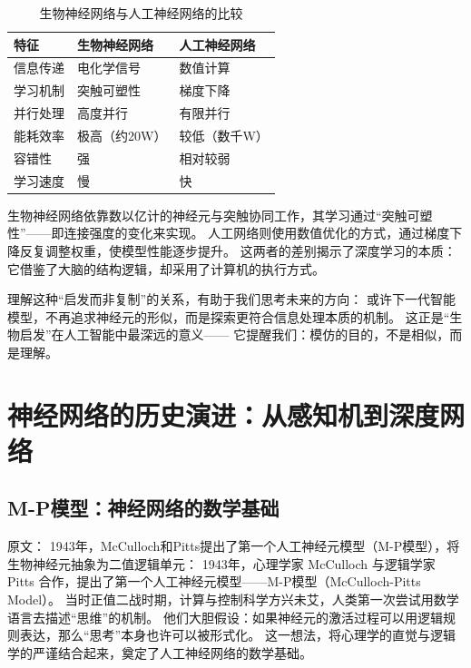 \begin{table}[htbp]
\centering
\caption{生物神经网络与人工神经网络的比较}
\label{tab:bio-vs-ann}
\begin{tabular}{|l|l|l|}
\hline
{\bf 特征} & {\bf 生物神经网络} & {\bf 人工神经网络} \\
\hline
信息传递 & 电化学信号 & 数值计算 \\
\hline
学习机制 & 突触可塑性 & 梯度下降 \\
\hline
并行处理 & 高度并行 & 有限并行 \\
\hline
能耗效率 & 极高（约20W） & 较低（数千W） \\
\hline
容错性 & 强 & 相对较弱 \\
\hline
学习速度 & 慢 & 快 \\
\hline
\end{tabular}
\end{table}

生物神经网络依靠数以亿计的神经元与突触协同工作，其学习通过“突触可塑性”——即连接强度的变化来实现。  
人工网络则使用数值优化的方式，通过梯度下降反复调整权重，使模型性能逐步提升。  
这两者的差别揭示了深度学习的本质：  
它借鉴了大脑的结构逻辑，却采用了计算机的执行方式。  

理解这种“启发而非复制”的关系，有助于我们思考未来的方向：  
或许下一代智能模型，不再追求神经元的形似，而是探索更符合信息处理本质的机制。  
这正是“生物启发”在人工智能中最深远的意义——  
它提醒我们：模仿的目的，不是相似，而是理解。

\section{神经网络的历史演进：从感知机到深度网络}

\subsection{M-P模型：神经网络的数学基础}

原文：
1943年，McCulloch和Pitts提出了第一个人工神经元模型（M-P模型），将生物神经元抽象为二值逻辑单元：
1943年，心理学家 McCulloch 与逻辑学家 Pitts 合作，提出了第一个人工神经元模型——M-P模型（McCulloch-Pitts Model）。  
当时正值二战时期，计算与控制科学方兴未艾，人类第一次尝试用数学语言去描述“思维”的机制。  
他们大胆假设：如果神经元的激活过程可以用逻辑规则表达，那么“思考”本身也许可以被形式化。  
这一想法，将心理学的直觉与逻辑学的严谨结合起来，奠定了人工神经网络的数学基础。

